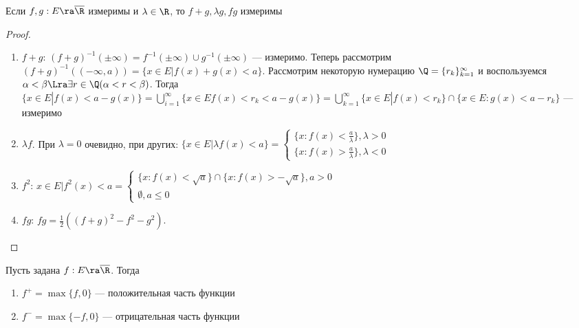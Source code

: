 
\begin{theorem}
    Если \(f, g: E \ra \overline{\R}\) измеримы и \(\lambda \in \R\), то \(f + g, \lambda g, fg\) измеримы
\end{theorem}
\begin{proof}\indent
    \begin{enumerate}
        \item \(f+ g\): \((f + g)^{-1}(\pm\infty) = f^{-1}(\pm\infty) \cup g^{-1}(\pm\infty)\) --- измеримо. Теперь рассмотрим \((f + g)^{-1}((-\infty, a)) = \{x \in E | f(x) + g(x) < a\}\). Рассмотрим некоторую нумерацию \(\Q = \{r_k\}_{k=1}^\infty\) и воспользуемся \(\alpha < \beta \Lra \exists r \in \Q (\alpha < r  < \beta)\). Тогда \(\{x \in E | f(x) < a - g(x)\} = \bigcup_{i = 1}^\infty \{x \in E f(x) < r_k < a - g(x)\} = \bigcup_{k = 1}^\infty \{x \in E | f(x) < r_k\} \cap \{x \in E: g(x) < a - r_k\}\) --- измеримо
        \item \(\lambda f\). При \(\lambda = 0\) очевидно, при других: \(\{x \in E | \lambda f(x) < a\} = \left\{\begin{array}{l}
            \{x : f(x) < \frac{a}{\lambda}\}, \lambda > 0 \\
            \{x : f(x) > \frac{a}{\lambda}\}, \lambda < 0
        \end{array}\right.\)
        \item \(f^2\): \(x \in E | f^2(x) < a = \left\{\begin{array}{l}
            \{x : f(x) < \sqrt{a}\} \cap \{x : f(x) > -\sqrt{a}\}, a > 0 \\
            \emptyset, a \le 0
        \end{array}\right.\)
        \item \(fg\): \(fg = \frac{1}{2}\left((f + g)^2 - f^2 - g^2\right)\).
    \end{enumerate}
\end{proof}

\begin{definition}
    Пусть задана \(f: E \ra \overline{\R}\). Тогда
    \begin{enumerate}
        \item \(f^+ = \max\{f, 0\}\) --- положительная часть функции
        \item \(f^- = \max\{-f, 0\}\) --- отрицательная часть функции
    \end{enumerate}
\end{definition}


